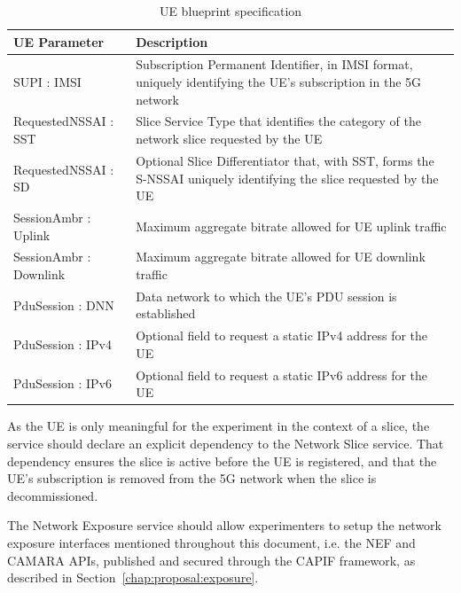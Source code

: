 \begin{table}[htbp]
    \centering
    \renewcommand\tabularxcolumn[1]{m{#1}}
    \begin{tabularx}{\textwidth}{|
        >{\RaggedRight\arraybackslash}m{}|
        >{\RaggedRight\arraybackslash}X|}
        \hline
        \textbf{\acs{UE} Parameter} & \textbf{Description} \\
        \hline
        \acs{SUPI} : \acs{IMSI} & Subscription Permanent Identifier, in \acs{IMSI} format, uniquely identifying the \acs{UE}'s subscription in the \acs{5G} network \\
        \hline
        Requested\acs{NSSAI} : \acs{SST}  & Slice Service Type that identifies the category of the network slice requested by the \acs{UE} \\
        \hline
        Requested\acs{NSSAI} : \acs{SD}  & Optional Slice Differentiator that, with \acs{SST}, forms the \acs{S-NSSAI} uniquely identifying the slice requested by the \acs{UE} \\
        \hline
        SessionAmbr : Uplink & Maximum aggregate bitrate allowed for \acs{UE} uplink traffic \\
        \hline
        SessionAmbr : Downlink & Maximum aggregate bitrate allowed for \acs{UE} downlink traffic \\
        \hline
        PduSession : \acs{DNN} & Data network to which the \acs{UE}'s \acs{PDU} session is established \\
        \hline
        PduSession : IPv4 & Optional field to request a static IPv4 address for the \acs{UE} \\
        \hline
        PduSession : IPv6 & Optional field to request a static IPv6 address for the \acs{UE} \\
        \hline
    \end{tabularx}
    \caption{\acs{UE} blueprint specification}
    \label{tab:proposal:delivery:ue-blueprint}
\end{table}

As the \acs{UE} is only meaningful for the experiment in the context of a slice, the service should declare an explicit dependency to the Network Slice service. That dependency ensures the slice is active before the \acs{UE} is registered, and that the \acs{UE}’s subscription is removed from the \acs{5G} network when the slice is decommissioned.



The Network Exposure service should allow experimenters to setup the network exposure interfaces mentioned throughout this document, i.e. the \acs{NEF} and CAMARA \acsp{API}, published and secured through the \acs{CAPIF} framework, as described in Section~\ref{chap:proposal:exposure}. 

